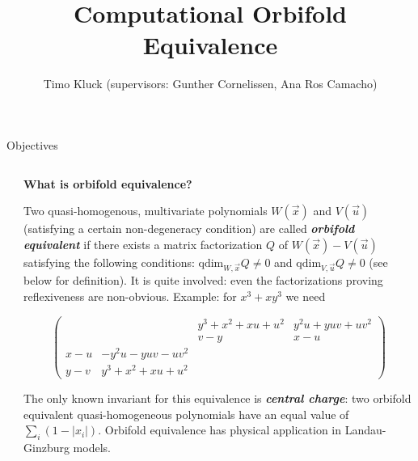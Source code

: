 \documentclass[final]{beamer}
\title{Computational Orbifold Equivalence} %
\author{Timo Kluck (supervisors: Gunther Cornelissen, Ana Ros Camacho)} %
\institute{Utrecht University} %
\newlength{\sepwid}
\newlength{\smallercolwid}
\begin{document}

\setlength{\belowcaptionskip}{2ex} %
\setlength\belowdisplayshortskip{2ex} %

\begin{frame}[t] %

\begin{alertblock}{Objectives}

\begin{columns}

\begin{column}{\sepwid}\end{column} %

\begin{column}{\smallercolwid} %

\justify

\textbf{\large{}What is orbifold equivalence?}{\large \par}

Two quasi-homogenous, multivariate polynomials $W(\vec{x})$
and $V(\vec{u})$ (satisfying a certain non-degeneracy
condition) are called \textbf{\emph{orbifold equivalent}} if there
exists a matrix factorization $Q$ of $W(\vec{x})-V(\vec{u})$
satisfying the following conditions: $\mathrm{qdim}_{W,\vec{x}}Q\neq0$
and $\mathrm{qdim}_{V,\vec{u}}Q\neq0$ (see below for definition).
It is quite involved: even the factorizations proving reflexiveness
are non-obvious. Example: for $x^{3}+xy^{3}$ we need

\[
\left(\begin{array}{cccc}
 &  & y^{3}+x^{2}+xu+u^{2} & y^{2}u+yuv+uv^{2}\\
 &  & v-y & x-u\\
x-u & -y^{2}u-yuv-uv^{2}\\
y-v & y^{3}+x^{2}+xu+u^{2}
\end{array}\right)
\]

The only known invariant for this equivalence is \textbf{\emph{central
charge}}: two orbifold equivalent quasi-homogeneous polynomials have an
equal value of $\sum_{i}(1 - |x_i|)$.
Orbifold equivalence has physical application in Landau-Ginzburg models.

\bigskip


\end{column}
\end{columns}
\end{alertblock}
\end{frame}
\end{document}
